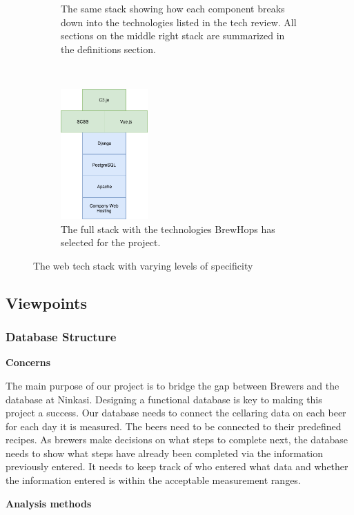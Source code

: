 \documentclass[draftclsnofoot,onecolumn,letterpaper,10pt]{IEEEtran}
\begin{document}
\begin{figure}
\begin{subfigure}[b]{0.2\textwidth}
        \caption{The same stack showing how each component breaks down into the technologies listed in the tech review. All sections on the middle right stack are summarized in the definitions section. }
        \label{fig:general_tech}
    \end{subfigure}
		~
    \begin{subfigure}[b]{0.2\textwidth}
        \includegraphics[height=5cm]{images/stack/chosen_tech}
        \caption{The full stack with the technologies BrewHops has selected for the project.}
        \label{fig:chosen_tech}
    \end{subfigure}
    \caption{The web tech stack with varying levels of specificity}\label{fig:animals}
\end{figure}


	\subsection{Viewpoints}
		\subsubsection{Database Structure}
			\textbf{Concerns}

			The main purpose of our project is to bridge the gap between Brewers and the database at Ninkasi. Designing a functional database is key to making this project a success. Our database needs to connect the cellaring data on each beer for each day it is measured. The beers need to be connected to their predefined recipes. As brewers make decisions on what steps to complete next, the database needs to show what steps have already been completed via the information previously entered. It needs to keep track of who entered what data and whether the information entered is within the acceptable measurement ranges.


			\textbf{Analysis methods}
\end{document}
